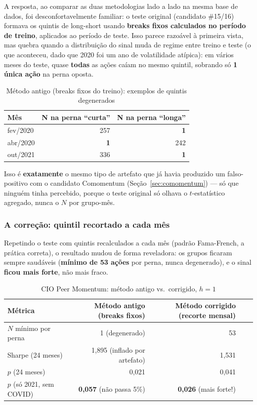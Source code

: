 \documentclass[11pt,a4paper]{article}
\begin{document}
A resposta, ao comparar as duas metodologias lado a lado na mesma base de
dados, foi desconfortavelmente familiar: o teste original (candidato
\#15/16) formava os quintis de long-short usando \textbf{breaks fixos
calculados no período de treino}, aplicados ao período de teste. Isso
parece razoável à primeira vista, mas quebra quando a distribuição do
sinal muda de regime entre treino e teste (o que aconteceu, dado que 2020
foi um ano de volatilidade atípica): em vários meses do teste, quase
\textbf{todas} as ações caíam no mesmo quintil, sobrando só \textbf{1
única ação} na perna oposta.

\begin{table}[H]\centering\small
\caption{Método antigo (breaks fixos do treino): exemplos de quintis degenerados}
\begin{tabular}{@{}lrr@{}}
\toprule
Mês & N na perna ``curta'' & N na perna ``longa'' \\
\midrule
fev/2020 & 257 & \textbf{1} \\
abr/2020 & \textbf{1} & 242 \\
out/2021 & 336 & \textbf{1} \\
\bottomrule
\end{tabular}
\end{table}

Isso é \textbf{exatamente} o mesmo tipo de artefato que já havia produzido
um falso-positivo com o candidato Comomentum
(Seção~\ref{sec:comomentum}) --- só que ninguém tinha percebido, porque o
teste original só olhava o $t$-estatístico agregado, nunca o $N$ por
grupo-mês.

\subsubsection{A correção: quintil recortado a cada mês}

Repetindo o teste com quintis recalculados a cada mês (padrão
Fama-French, a prática correta), o resultado mudou de forma reveladora: os
grupos ficaram sempre saudáveis (\textbf{mínimo de 53 ações} por perna,
nunca degenerado), e o sinal \textbf{ficou mais forte}, não mais fraco.

\begin{table}[H]\centering\small
\caption{CIO Peer Momentum: método antigo vs.\ corrigido, $h=1$}
\begin{tabular}{@{}lrrrr@{}}
\toprule
Métrica & Método antigo (breaks fixos) & Método corrigido (recorte mensal) \\
\midrule
$N$ mínimo por perna & 1 (degenerado) & 53 \\
Sharpe (24 meses) & 1,895 (inflado por artefato) & 1,531 \\
$p$ (24 meses) & 0,021 & 0,041 \\
$p$ (só 2021, sem COVID) & \textbf{0,057} (não passa 5\%) & \textbf{0,026} (mais forte!) \\
\bottomrule
\end{tabular}
\end{table}
\end{document}
